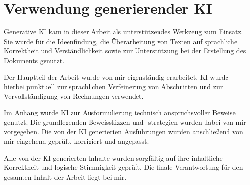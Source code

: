 \documentclass[../../main.tex]{subfiles}
\begin{document}
\chapter*{Verwendung generierender KI}
Generative KI kam in dieser Arbeit als unterstützendes Werkzeug zum Einsatz. Sie wurde für die Ideenfindung, die Überarbeitung von Texten auf sprachliche Korrektheit und Verständlichkeit sowie zur Unterstützung bei der Erstellung des Dokuments genutzt.

Der Hauptteil der Arbeit wurde von mir eigenständig erarbeitet. KI wurde hierbei punktuell zur sprachlichen Verfeinerung von Abschnitten und zur Vervollständigung von Rechnungen verwendet.

Im Anhang wurde KI zur Ausformulierung technisch anspruchsvoller Beweise genutzt. Die grundlegenden Beweisskizzen und -strategien wurden dabei von mir vorgegeben. Die von der KI generierten Ausführungen wurden anschließend von mir eingehend geprüft, korrigiert und angepasst.

Alle von der KI generierten Inhalte wurden sorgfältig auf ihre inhaltliche Korrektheit und logische Stimmigkeit geprüft. Die finale Verantwortung für den gesamten Inhalt der Arbeit liegt bei mir.
\end{document}
